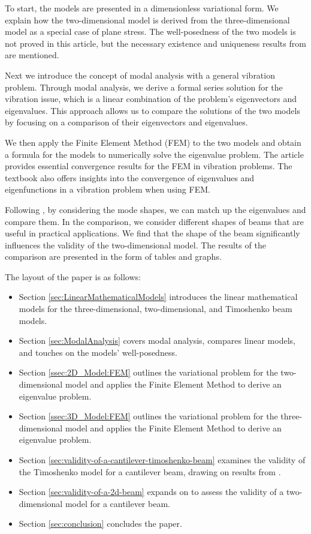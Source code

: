 To start, the models are presented in a dimensionless variational form. We explain how the two-dimensional model is derived from the three-dimensional model as a special case of plane stress. The well-posedness of the two models is not proved in this article, but the necessary existence and uniqueness results from \cite{VV02} are mentioned.

Next we introduce the concept of modal analysis with a general vibration problem. Through modal analysis, we derive a formal series solution for the vibration issue, which is a linear combination of the problem's eigenvectors and eigenvalues. This approach allows us to compare the solutions of the two models by focusing on a comparison of their eigenvectors and eigenvalues.

We then apply the Finite Element Method (FEM) to the two models and obtain a formula for the models to numerically solve the eigenvalue problem. The article \cite{BV13} provides essential convergence results for the FEM in vibration problems. The textbook \cite{SF73} also offers insights into the convergence of eigenvalues and eigenfunctions in a vibration problem when using FEM. 

Following \cite{LVV09}, by considering the mode shapes, we can match up the eigenvalues and compare them. In the comparison, we consider different shapes of beams that are useful in practical applications. We find that the shape of the beam significantly influences the validity of the two-dimensional model. The results of the comparison are presented in the form of tables and graphs.

The layout of the paper is as follows:
\begin{itemize}
\item Section \ref{sec:LinearMathematicalModels} introduces the linear mathematical models for the three-dimensional, two-dimensional, and Timoshenko beam models.
\item Section \ref{sec:ModalAnalysis} covers modal analysis, compares linear models, and touches on the models' well-posedness.
\item Section \ref{ssec:2D_Model:FEM} outlines the variational problem for the two-dimensional model and applies the Finite Element Method to derive an eigenvalue problem.
\item Section \ref{ssec:3D_Model:FEM} outlines the variational problem for the three-dimensional model and applies the Finite Element Method to derive an eigenvalue problem.
\item Section \ref{sec:validity-of-a-cantilever-timoshenko-beam} examines the validity of the Timoshenko model for a cantilever beam, drawing on results from \cite{LVV09}.
\item Section \ref{sec:validity-of-a-2d-beam} expands on \cite{LVV09} to assess the validity of a two-dimensional model for a cantilever beam.
\item Section \ref{sec:conclusion} concludes the paper.
\end{itemize}



